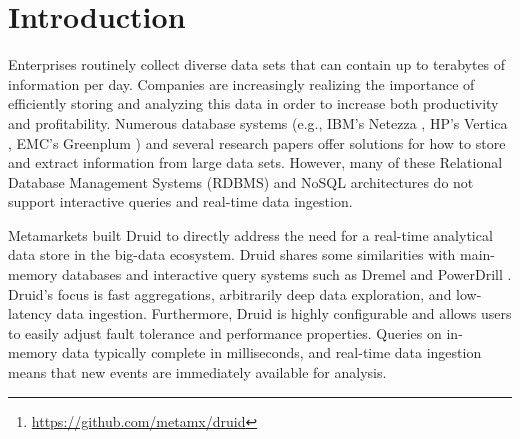 \documentclass{vldb}
\begin{document}
\maketitle

\begin{abstract}
Druid is an open source\footnote{\href{https://github.com/metamx/druid}{https://github.com/metamx/druid}}, real-time analytical data store that supports
fast ad-hoc queries on large-scale data sets. The system combines a
column-oriented data layout, a shared-nothing architecture, and an advanced
indexing structure to allow for the arbitrary exploration of billion-row
tables with sub-second latencies. Druid scales horizontally and is the
core engine of the Metamarkets data analytics platform. In this paper, we detail Druid's architecture, and describe how it supports real-time data ingestion and interactive analytical queries. 
\end{abstract}

\section{Introduction}
Enterprises routinely collect diverse data sets that can contain up to terabytes of information per day. Companies are increasingly realizing the importance of efficiently storing and analyzing this data in order to increase both productivity and profitability. Numerous database systems (e.g., IBM’s Netezza \cite{singh2011introduction}, HP's Vertica \cite{bear2012vertica}, EMC’s Greenplum \cite{miner2012unified}) and several research papers \cite{barroso2009datacenter, chaudhuri1997overview, dewitt1992parallel} offer solutions for how to store and extract information from large data sets. However, many of these Relational Database Management Systems (RDBMS) and NoSQL architectures do not support interactive queries and real-time data ingestion.

Metamarkets built Druid to directly address the need for a real-time analytical data store in the big-data ecosystem. Druid shares some similarities with main-memory databases \cite{farber2012sap} and interactive query systems such as Dremel \cite{melnik2010dremel} and PowerDrill \cite{hall2012processing}. Druid's focus is fast aggregations, arbitrarily deep data exploration, and low-latency data ingestion. Furthermore, Druid is highly configurable and allows users to easily adjust fault tolerance and performance properties. Queries on in-memory data typically complete in milliseconds, and real-time data ingestion means that new events are immediately available for analysis.
\end{document}

